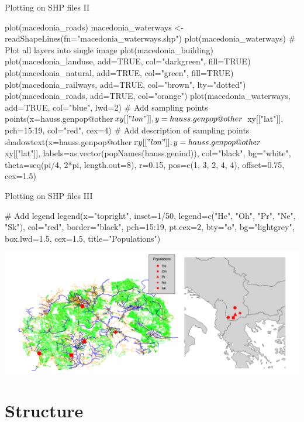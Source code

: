 \documentclass[compress, ucs, xelatex, 11pt, xcolor=svgnames,
  hyperref={
    bookmarks=true,
    unicode=true,
    colorlinks=true,
    pdftitle={Molecular data in R},
    plainpages=false,
    pdfauthor={Vojtech Zeisek},
    pdfsubject={Course about phylogeny and evolution in R},
    pdfcreator={XeLaTeX},
    pdfkeywords={R, evolution, phylogeny, molecular data},
    linkcolor=Tomato,
    anchorcolor=SaddleBrown,
    citecolor=Goldenrod,
    filecolor=DarkMagenta,
    menucolor=Sienna,
    urlcolor=DarkTurquoise,
    pdftex},
  url={hyphens, lowtilde} %
  ]{beamer}
\begin{document}
\begin{frame}[fragile]{Plotting on SHP files II}
  \begin{spluscode}
    plot(macedonia_roads)
    macedonia_waterways <- readShapeLines(fn="macedonia_waterways.shp")
    plot(macedonia_waterways)
    # Plot all layers into single image
    plot(macedonia_building)
    plot(macedonia_landuse, add=TRUE, col="darkgreen", fill=TRUE)
    plot(macedonia_natural, add=TRUE, col="green", fill=TRUE)
    plot(macedonia_railways, add=TRUE, col="brown", lty="dotted")
    plot(macedonia_roads, add=TRUE, col="orange")
    plot(macedonia_waterways, add=TRUE, col="blue", lwd=2)
    # Add sampling points
    points(x=hauss.genpop@other$xy[["lon"]], y=hauss.genpop@other$
      xy[["lat"]], pch=15:19, col="red", cex=4)
    # Add description of sampling points
    shadowtext(x=hauss.genpop@other$xy[["lon"]], y=hauss.genpop@other$
      xy[["lat"]], labels=as.vector(popNames(hauss.genind)), col="black",
      bg="white", theta=seq(pi/4, 2*pi, length.out=8), r=0.15,
      pos=c(1, 3, 2, 4, 4), offset=0.75, cex=1.5)
  \end{spluscode}
\end{frame}

\begin{frame}[fragile]{Plotting on SHP files III}
  \begin{spluscode}
    # Add legend
    legend(x="topright", inset=1/50, legend=c("He", "Oh", "Pr", "Ne",
      "Sk"), col="red", border="black", pch=15:19, pt.cex=2, bty="o",
      bg="lightgrey", box.lwd=1.5, cex=1.5, title="Populations")
  \end{spluscode}

  \includegraphics[width=\textwidth]{mapy.png}
\end{frame}

\section{Structure}
\end{document}
